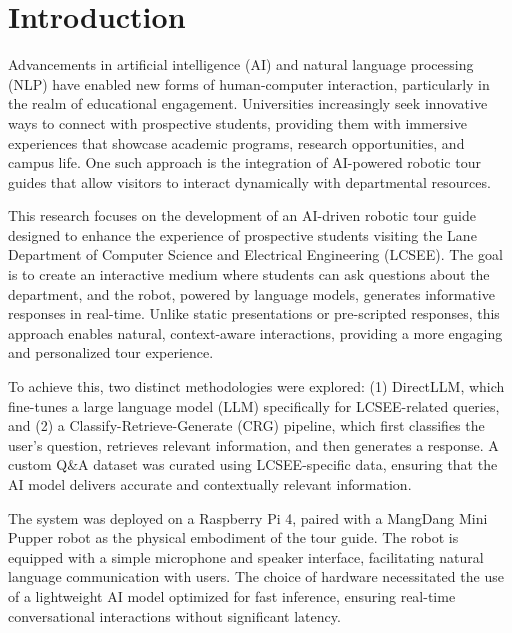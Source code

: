 \documentclass[conference]{IEEEtran}
\begin{document}

\section{Introduction}
Advancements in artificial intelligence (AI) and natural language processing (NLP) have enabled new forms of human-computer interaction, particularly in the realm of educational engagement. 
Universities increasingly seek innovative ways to connect with prospective students, providing them with immersive experiences that showcase academic programs, research opportunities, and campus life. 
One such approach is the integration of AI-powered robotic tour guides that allow visitors to interact dynamically with departmental resources.

This research focuses on the development of an AI-driven robotic tour guide designed to enhance the experience of prospective students visiting the Lane Department of Computer Science and Electrical Engineering (LCSEE). 
The goal is to create an interactive medium where students can ask questions about the department, and the robot, powered by language models, generates informative responses in real-time. 
Unlike static presentations or pre-scripted responses, this approach enables natural, context-aware interactions, providing a more engaging and personalized tour experience.

To achieve this, two distinct methodologies were explored: 
(1) DirectLLM, which fine-tunes a large language model (LLM) specifically for LCSEE-related queries, and 
(2) a Classify-Retrieve-Generate (CRG) pipeline, which first classifies the user's question, retrieves relevant information, and then generates a response. 
A custom Q\&A dataset was curated using LCSEE-specific data, ensuring that the AI model delivers accurate and contextually relevant information.

The system was deployed on a Raspberry Pi 4, paired with a MangDang Mini Pupper \cite{b1} robot as the physical embodiment of the tour guide. 
The robot is equipped with a simple microphone and speaker interface, facilitating natural language communication with users. 
The choice of hardware necessitated the use of a lightweight AI model optimized for fast inference, ensuring real-time conversational interactions without significant latency.
\end{document}
